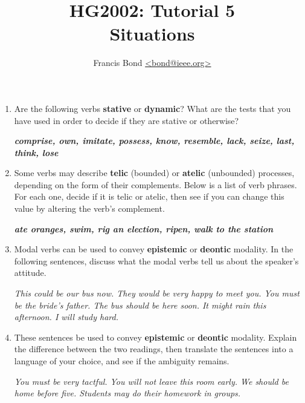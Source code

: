 \documentclass[a4paper]{article}
\title{\vspace*{-30mm}HG2002: Tutorial 5\\   Situations}
\author{Francis Bond \url{<bond@ieee.org>}}
\date{}%
\newcommand{\lex}[1]{\textbf{\textit{#1}}}
\newcommand{\ix}{\ex\it}
\begin{document}
\maketitle

\begin{enumerate}


\item Are the following verbs \textbf{stative} or \textbf{dynamic}?
  What are the tests that you have used in order to decide if they are
  stative or otherwise?

\lex{comprise, own, imitate, possess, know, resemble, lack, seize, last, think, lose}


\item Some verbs may describe \textbf{telic} (bounded) or \textbf{atelic} (unbounded)
  processes, depending on the form of their complements.  Below is a
  list of verb phrases. For each one, decide if it is telic or atelic,
  then see if you can change this value by altering the verb’s
  complement.

\lex{ate oranges, swim, rig an election, ripen, walk to the station}

\item Modal verbs can be used to convey \textbf{epistemic} or
  \textbf{deontic} modality. In the following sentences, discuss what
  the modal verbs tell us about the speaker’s attitude.

  \begin{exe}
    \ix This could be our bus now.
    \ix They would be very happy to meet you.
    \ix You must be the bride's father.
    \ix The bus should be here soon.
    \ix It might rain this afternoon.
    \ix I will study hard.
  \end{exe}

\item These sentences be used to convey \textbf{epistemic} or
  \textbf{deontic} modality. Explain the difference between the two
  readings, then translate the sentences into a language of your
  choice, and see if the ambiguity remains.
  \begin{exe}
    \ix You must be very tactful.
    \ix You will not leave this room early.
    \ix We should be home before five.
    \ix Students may do their homework in groups. 
  \end{exe}


\end{enumerate}
\end{document}
